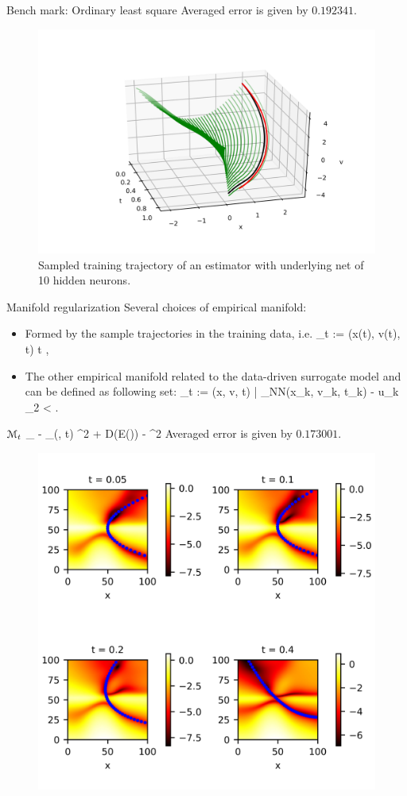 \documentclass{beamer}
\begin{document}
\begin{frame}{Bench mark: Ordinary least square}
	Averaged error is given by $0.192341$.
	\begin{figure}[H]
          \centering
          \centerline{\includegraphics[width=0.7\linewidth]{fig/control1-1.jpg}}
          \caption{Sampled training trajectory of an estimator with underlying net of 		10 hidden neurons.}
	\end{figure}
\end{frame}


\begin{frame}{Manifold regularization}
	Several choices of empirical manifold:
	\begin{itemize}
		\item Formed by the sample trajectories in the training data, i.e.
	\bequn
		\mcM_t := \lbb (x(t), v(t), t)  \quad t \in [0, 1]  \rbb,
	\eequn
		\item The other empirical manifold related to the data-driven surrogate model and can be defined as following set:
\bequn
	\wht \mcM_t := \lbb (x, v, t) \Big| \norml \phi_{NN}(x_k, v_k, t_k) - u_k \normr_2 < \epsilon \rbb.
\eequn
	
\end{itemize}
\end{frame}


\begin{frame}{$ \mathcal{M}_t $}
\bequn
		\min_{\theta} \mbE \norml \mfu - \phi_{\theta}(\mfx, t) \normr^2 + \lambda \norml D(E(\wht \mfx)) - \wht \mfx \normr^2
	\eequn
	Averaged error is given by $0.173001$.
	\begin{figure}[H]
          \centering
          \centerline{\includegraphics[width=0.65\linewidth]{fig/control6.jpg}}
          \label{l2-mfd}
\end{figure}
\end{frame}
\end{document}
